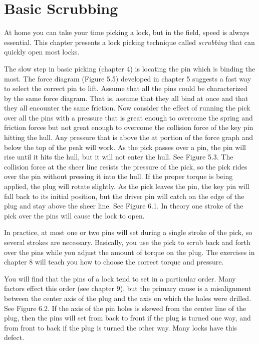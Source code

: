 \chapter{Basic Scrubbing}
At home you can take your time picking a lock, but in the field, speed is always essential.
This chapter presents a lock picking technique called \textit{scrubbing} that can quickly open most locks.

The slow step in basic picking (chapter 4) is locating the pin which is binding the most.
The force diagram (Figure 5.5) developed in chapter 5 suggests a fast way to select the correct pin to lift.
Assume that all the pins could be characterized by the same force diagram.
That is, assume that they all bind at once and that they all encounter the same friction.
Now consider the effect of running the pick over all the pins with a pressure that is great enough to overcome the spring and friction forces but not great enough to overcome the collision force of the key pin hitting the hull.
Any pressure that is above the at portion of the force graph and below the top of the peak will work.
As the pick passes over a pin, the pin will rise until it hits the hull, but it will not enter the hull.
See Figure 5.3.
The collision force at the sheer line resists the pressure of the pick, so the pick rides over the pin without pressing it into the hull.
If the proper torque is being applied, the plug will rotate slightly.
As the pick leaves the pin, the key pin will fall back to its initial position, but the driver pin will catch on the edge of the plug and stay above the sheer line.
See Figure 6.1.
In theory one stroke of the pick over the pins will cause the lock to open.

In practice, at most one or two pins will set during a single stroke of the pick, so several strokes are necessary.
Basically, you use the pick to scrub back and forth over the pins while you adjust the amount of torque on the plug.
The exercises in chapter 8 will teach you how to choose the correct torque and pressure.

You will find that the pins of a lock tend to set in a particular order. Many factors effect
this order (see chapter 9), but the primary cause is a misalignment between the center axis
of the plug and the axis on which the holes were drilled. See Figure 6.2. If the axis of the
pin holes is skewed from the center line of the plug, then the pins will set from back to front
if the plug is turned one way, and from front to back if the plug is turned the other way.
Many locks have this defect.

